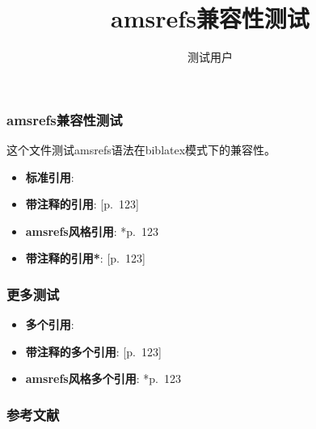 \documentclass[biblatex]{ustcmb}
\title{amsrefs兼容性测试}
\author{测试用户}
\institute{测试机构}
\begin{document}
\frame{\titlepage}

\begin{frame}
\frametitle{amsrefs兼容性测试}

这个文件测试amsrefs语法在biblatex模式下的兼容性。

\begin{itemize}
\item \textbf{标准引用}: \cite{EellsSampson1964Harmonic}
\item \textbf{带注释的引用}: \cite{EellsSampson1964Harmonic}[p.~123]
\item \textbf{amsrefs风格引用}: \cite{EellsSampson1964Harmonic}*{p.~123}
\item \textbf{带注释的引用*}: \cite*{EellsSampson1964Harmonic}[p.~123]
\end{itemize}

\end{frame}

\begin{frame}
\frametitle{更多测试}

\begin{itemize}
\item \textbf{多个引用}: \cite{EellsSampson1964Harmonic,AtiyahBott1983Yang}
\item \textbf{带注释的多个引用}: \cite{EellsSampson1964Harmonic,AtiyahBott1983Yang}[p.~123]
\item \textbf{amsrefs风格多个引用}: \cite{EellsSampson1964Harmonic,AtiyahBott1983Yang}*{p.~123}
\end{itemize}

\end{frame}

\begin{frame}
\frametitle{参考文献}

\printbibliography

\end{frame}
\end{document}
